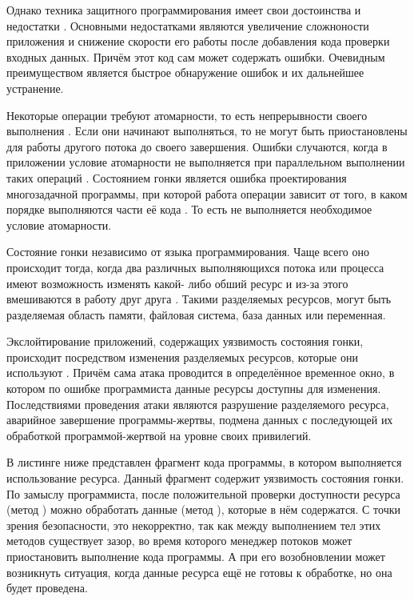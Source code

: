 %
Однако техника защитного программирования имеет свои достоинства и недостатки 
. 
%
Основными недостатками являются увеличение сложноности приложения и снижение скорости его работы 
после добавления кода проверки входных данных. 
%
Причём этот код сам может содержать ошибки. 
%
Очевидным преимуществом является быстрое обнаружение ошибок и их дальнейшее устранение.



%
Некоторые операции требуют атомарности, то есть непрерывности своего выполнения 
. 
%
Если они начинают выполняться, то не могут быть приостановлены для работы другого потока до своего 
завершения. 
%
Ошибки случаются, когда в приложении условие атомарности не выполняется при параллельном выполнении 
таких операций . 
%
Состоянием гонки является ошибка проектирования многозадачной программы, при которой работа 
операции зависит от того, в каком порядке выполняются части её кода . 
%
То есть не выполняется необходимое условие атомарности.

%
Состояние гонки независимо от языка программирования. 
%
Чаще всего оно происходит тогда, когда два различных выполняющихся потока или процесса имеют 
возможность изменять какой- либо обший ресурс и из-за этого вмешиваются в работу друг друга 
. 
%
Такими разделяемых ресурсов, могут  быть разделяемая область памяти, файловая система, база данных 
или переменная. 

%
Экслойтирование приложений, содержащих уязвимость состояния гонки, происходит посредством изменения 
разделяемых ресурсов, которые они используют . 
%
Причём сама атака проводится в определённое временное окно, в котором по ошибке программиста данные 
ресурсы доступны для изменения. 
%
Последствиями проведения атаки являются разрушение разделяемого ресурса, аварийное завершение 
программы-жертвы, подмена данных с последующей их обработкой программой-жертвой на уровне своих 
привилегий. 

%
В листинге ниже представлен фрагмент кода программы, в котором выполняется использование ресурса. 
%
Данный фрагмент содержит уязвимость состояния гонки. 
%
По замыслу программиста, после положительной проверки доступности ресурса (метод 
) можно обработать данные (метод 
), которые в нём содержатся. 
% 
С точки зрения безопасности, это некорректно, так как между выполнением тел этих методов существует 
зазор, во время которого менеджер потоков может приостановить выполнение кода программы. 
%
А при его возобновлении может возникнуть ситуация, когда данные ресурса ещё не готовы к обработке, 
но она будет проведена. 

